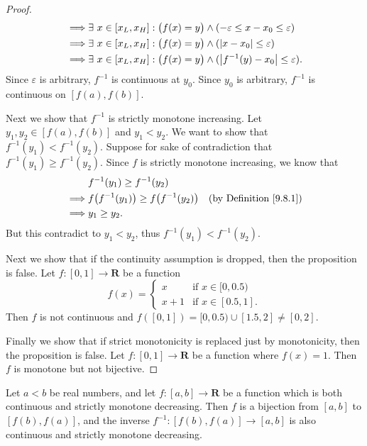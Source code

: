 \begin{proof}
\begin{align*}
        \implies & \exists\ x \in [x_L, x_H] : \big(f(x) = y\big) \land (-\varepsilon \leq x - x_0 \leq \varepsilon)                                   \\
        \implies & \exists\ x \in [x_L, x_H] : \big(f(x) = y\big) \land (\abs*{x - x_0} \leq \varepsilon)                                              \\
        \implies & \exists\ x \in [x_L, x_H] : \big(f(x) = y\big) \land (\abs*{f^{-1}(y) - x_0} \leq \varepsilon).
    \end{align*}
    Since \(\varepsilon\) is arbitrary, \(f^{-1}\) is continuous at \(y_0\).
    Since \(y_0\) is arbitrary, \(f^{-1}\) is continuous on \([f(a), f(b)]\).

    Next we show that \(f^{-1}\) is strictly monotone increasing.
    Let \(y_1, y_2 \in [f(a), f(b)]\) and \(y_1 < y_2\).
    We want to show that \(f^{-1}(y_1) < f^{-1}(y_2)\).
    Suppose for sake of contradiction that \(f^{-1}(y_1) \geq f^{-1}(y_2)\).
    Since \(f\) is strictly monotone increasing, we know that
    \begin{align*}
                 & f^{-1}(y_1) \geq f^{-1}(y_2)                                                            \\
        \implies & f\big(f^{-1}(y_1)\big) \geq f\big(f^{-1}(y_2)\big) & \text{(by Definition \ref{9.8.1})} \\
        \implies & y_1 \geq y_2.
    \end{align*}
    But this contradict to \(y_1 < y_2\), thus \(f^{-1}(y_1) < f^{-1}(y_2)\).

    Next we show that if the continuity assumption is dropped, then the proposition is false.
    Let \(f : [0, 1] \to \mathbf{R}\) be a function
    \[
        f(x) = \begin{cases}
            x     & \text{if } x \in [0, 0.5)  \\
            x + 1 & \text{if } x \in [0.5, 1].
        \end{cases}
    \]
    Then \(f\) is not continuous and \(f([0, 1]) = [0, 0.5) \cup [1.5, 2] \neq [0, 2]\).

    Finally we show that if strict monotonicity is replaced just by monotonicity, then the proposition is false.
    Let \(f : [0, 1] \to \mathbf{R}\) be a function where \(f(x) = 1\).
    Then \(f\) is monotone but not bijective.
\end{proof}

\begin{additional corollary}\label{ac 9.8.1}
Let \(a < b\) be real numbers, and let \(f : [a, b] \to \mathbf{R}\) be a function which is both continuous and strictly monotone decreasing.
Then \(f\) is a bijection from \([a, b]\) to \([f(b), f(a)]\), and the inverse \(f^{-1} : [f(b), f(a)] \to [a, b]\) is also continuous and strictly monotone decreasing.
\end{additional corollary}

